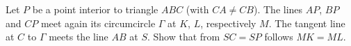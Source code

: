 Let $P$ be a point interior to triangle $ABC$ (with $CA \neq CB$). The lines $AP$,  $BP$ and $CP$ meet again its circumcircle $\Gamma$ at $K$,  $L$,  respectively $M$. The tangent line at $C$ to $\Gamma$ meets the line $AB$ at $S$. Show that from $SC = SP$ follows $MK = ML$.